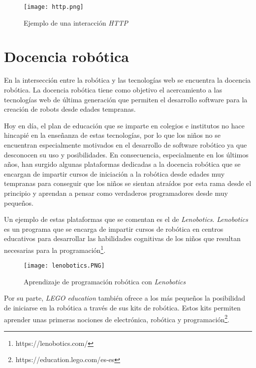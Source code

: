 \begin{figure}[h!]
    \centering
    \texttt{[image: http.png]}
    \caption{Ejemplo de una interacción \textit{HTTP} \footnotemark}
    \label{fig:http}
\end{figure}

\section{Docencia robótica}
En la intersección entre la robótica y las tecnologías web se encuentra la docencia robótica. La docencia robótica tiene como objetivo el acercamiento a las tecnologías web de última generación que permiten el desarrollo software para la creación de robots desde edades tempranas. \newline


Hoy en día, el plan de educación que se imparte en colegios e institutos no hace hincapié en la enseñanza de estas tecnologías, por lo que los niños no se encuentran especialmente motivados en el desarrollo de software robótico ya que desconocen su uso y posibilidades. En consecuencia, especialmente en los últimos años, han surgido algunas plataformas dedicadas a la docencia robótica que se encargan de impartir cursos de iniciación a la robótica desde edades muy tempranas para conseguir que los niños se sientan atraídos por esta rama desde el principio y aprendan a pensar como verdaderos programadores desde muy pequeños. \newline



Un ejemplo de estas plataformas que se comentan es el de \textit{Lenobotics}.  \textit{Lenobotics} es un programa que se encarga de impartir cursos de robótica en centros educativos para desarrollar las habilidades cognitivas de los niños que resultan necesarias para la programación\footnote{https://lenobotics.com/}. \newline

\begin{figure}[h!]
    \centering
    \texttt{[image: lenobotics.PNG]}
    \caption{Aprendizaje de programación robótica con \textit{Lenobotics}}
    \label{fig:lenobotics}
\end{figure}


Por su parte, \textit{LEGO education}  también ofrece a los más pequeños la posibilidad de iniciarse en la robótica a través de sus kits de robótica. Estos kits permiten aprender unas primeras nociones de electrónica, robótica y programación\footnote{https://education.lego.com/es-es}. \newline

